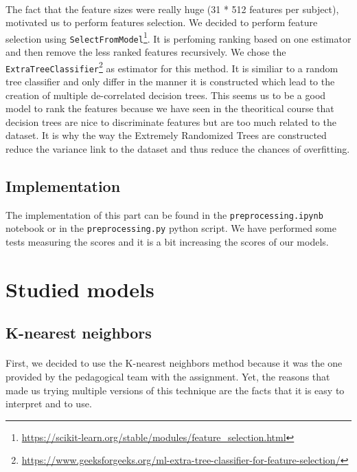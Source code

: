 \documentclass[a4paper, 11pt, oneside]{article}
\begin{document}
\paragraph{}The fact that the feature sizes were really huge (31 * 512 features per subject), motivated us to perform features selection. We decided to perform feature selection using \texttt{SelectFromModel}\footnote{\url{https://scikit-learn.org/stable/modules/feature_selection.html}}. It is perfoming ranking based on one estimator and then remove the less ranked features recursively. We chose the \texttt{ExtraTreeClassifier}\footnote{\url{https://www.geeksforgeeks.org/ml-extra-tree-classifier-for-feature-selection/}} as estimator for this method. It is similiar to a random tree classifier and only differ in the manner it is constructed which lead to the creation of multiple de-correlated decision trees. This seems us to be a good model to rank the features because we have seen in the theoritical course that decision trees are nice to discriminate features but are too much related to the dataset. It is why the way the Extremely Randomized Trees are constructed reduce the variance link to the dataset and thus reduce the chances of overfitting.

\subsection{Implementation}

The implementation of this part can be found in the \texttt{preprocessing.ipynb} notebook or in the \texttt{preprocessing.py} python script. We have performed some tests measuring the scores and it is a bit increasing the scores of our models.

\section{Studied models}

\subsection{K-nearest neighbors}
\paragraph{}First, we decided to use the K-nearest neighbors method because it was the one provided by the pedagogical team with the assignment. Yet, the reasons that made us trying multiple versions of this technique are the facts that it is easy to interpret and to use.
\end{document}
